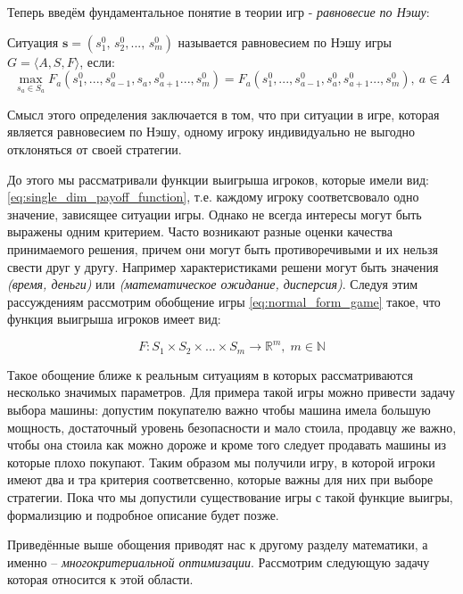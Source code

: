 Теперь введём фундаментальное понятие в теории игр - 
\textit{равновесие по Нэшу}:

\begin{Def}
	Ситуация $\textbf{s} = (s_1^0, \, s_2^0, ..., \, s_m^0)$ называется
	равновесием по Нэшу игры 
	$G = \big \langle A, S, F \big \rangle$, если:
	\begin{equation}
		\max \limits_{s_a \in S_a} 
		F_a(s_1^0, ..., s_{a-1}^0, s_a, s_{a+1}^0..., s_m^0)=
		F_a(s_1^0, ..., s_{a-1}^0, s_a^0, s_{a+1}^0..., s_m^0),
		\: a \in A	
		\label{eq:nash_equilibrium}
	\end{equation}
\end{Def}

Смысл этого определения заключается в том, что 
при ситуации в игре, которая является равновесием по Нэшу,
одному игроку индивидуально не выгодно отклоняться от своей стратегии.

До этого мы рассматривали функции выигрыша 
игроков, которые имели вид:
\eqref{eq:single_dim_payoff_function}, т.е. каждому игроку 
соответсвовало одно значение, зависящее ситуации игры.
Однако не всегда интересы могут быть выражены одним критерием. Часто 
возникают разные оценки качества принимаемого решения, причем они могут 
быть противоречивыми и их нельзя свести друг у другу. Например 
характеристиками решени могут быть значения \textit{(время, деньги)} или 
\textit{(математическое ожидание, дисперсия)}. Следуя этим рассуждениям  
рассмотрим обобщение игры \eqref{eq:normal_form_game} такое, что функция
выигрыша игроков имеет вид:

\begin{equation}
	F: S_1 \times S_2 \times ... \times S_m \rightarrow \mathbb R^m
	, \; m \in \mathbb{N}
	\label{eq:multidem_payoff_function}
\end{equation}

Такое обощение ближе к реальным ситуациям
в которых рассматриваются несколько значимых параметров. Для примера 
такой игры можно привести задачу выбора машины: допустим покупателю важно
чтобы машина имела большую мощность, достаточный уровень безопасности 
и мало стоила, продавцу же важно, чтобы она стоила как можно дороже и 
кроме того следует продавать машины из которые плохо покупают. 
Таким образом мы получили игру, в которой игроки имеют два и тра критерия
соответсвенно, которые важны для них при выборе стратегии. 
Пока что мы допустили существование игры с такой
функцие выигры, формализцию и подробное описание будет позже.

Приведённые выше обощения приводят нас к другому разделу
математики, а именно -- \textit{многокритериальной оптимизации}.
Рассмотрим следующую задачу которая относится к этой области.

